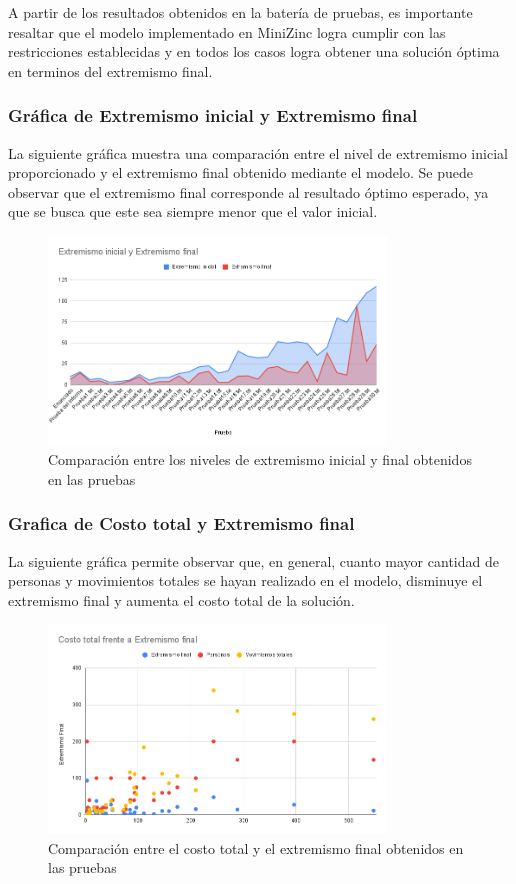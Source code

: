 \documentclass[11pt,letter]{article}
\begin{document}
A partir de los resultados obtenidos en la batería de pruebas, es importante resaltar que el modelo implementado en MiniZinc logra cumplir con las restricciones establecidas y en todos los casos logra obtener una solución óptima en terminos del extremismo final. 


\subsubsection*{Gráfica de Extremismo inicial y Extremismo final}
La siguiente gráfica muestra una comparación entre el nivel de extremismo inicial proporcionado y el extremismo final obtenido mediante el modelo. Se puede observar que el extremismo final corresponde al resultado óptimo esperado, ya que se busca que este sea siempre menor que el valor inicial.
\begin{figure}[H]
    \centering
    \includegraphics[width=0.8\textwidth]{resources/extremismoiyf.png}
    \caption{Comparación entre los niveles de extremismo inicial y final obtenidos en las pruebas}
\end{figure}

\subsubsection*{Grafica de Costo total y Extremismo final}
La siguiente gráfica permite observar que, en general, cuanto mayor cantidad de personas y movimientos totales se hayan realizado en el modelo, disminuye el extremismo final y aumenta el costo total de la solución.

\begin{figure}[H]
    \centering
    \includegraphics[width=0.8\textwidth]{resources/costototalvsextremismofinal.png}
    \caption{Comparación entre el costo total y el extremismo final obtenidos en las pruebas}
\end{figure}
\end{document}

